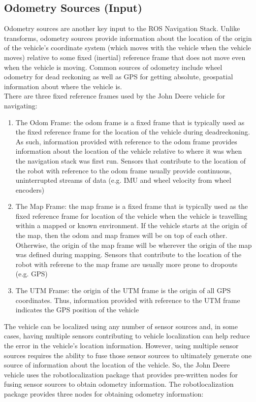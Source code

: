 \subsection{Odometry Sources (Input)}
\label{sec:gatorloc}

Odometry sources are another key input to the ROS Navigation Stack. Unlike transforms, odometry sources provide information about the location of the origin of the vehicle's coordinate system (which moves with the vehicle when the vehicle moves) relative to some fixed (inertial) reference frame that does not move even when the vehicle is moving. Common sources of odometry include wheel odometry for dead reckoning as well as GPS for getting absolute, geospatial information about where the vehicle is.\ \\
%
There are three fixed reference frames used by the John Deere vehicle for navigating:

\begin{enumerate}
\item The Odom Frame: the odom frame is a fixed frame that is typically used as the fixed reference frame for the location of the vehicle during deadreckoning. As such, information provided with reference to the odom frame provides information about the location of the vehicle relative to where it was when the navigation stack was first run. Sensors that contribute to the location of the robot with reference to the odom frame usually provide continuous, uninterrupted streams of data (e.g. IMU and wheel velocity from wheel encoders)
\item The Map Frame: the map frame is a fixed frame that is typically used as the fixed reference frame for location of the vehicle when the vehicle is travelling within a mapped or known environment. If the vehicle starts at the origin of the map, then the odom and map frames will be on top of each other. Otherwise, the origin of the map frame will be wherever the origin of the map was defined during mapping. Sensors that contribute to the location of the robot with referene to the map frame are usually more prone to dropouts (e.g. GPS)
\item The UTM Frame: the origin of the UTM frame is the origin of all GPS coordinates. Thus, information provided with reference to the UTM frame indicates the GPS position of the vehicle
\end{enumerate}

\noindent The vehicle can be localized using any number of sensor sources and, in some cases, having multiple sensors contributing to vehicle localization can help reduce the error in the vehicle's location information. However, using multiple sensor sources requires the ability to fuse those sensor sources to ultimately generate one source of information about the location of the vehicle. So, the John Deere vehicle uses the robot\textunderscore localization package that provides pre-written nodes for fusing sensor sources to obtain odometry information. The robot\textunderscore localization package provides three nodes for obtaining odometry information:

